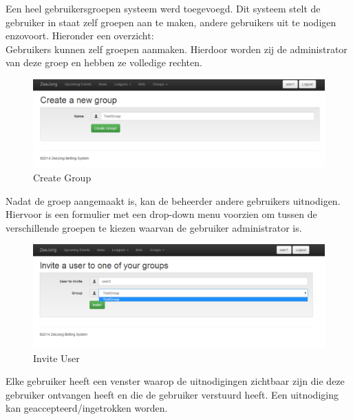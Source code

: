 \documentclass[11pt]{article}
\begin{document}
Een heel gebruikersgroepen systeem werd toegevoegd.  Dit systeem stelt de gebruiker in staat zelf groepen aan te maken, andere gebruikers uit te nodigen enzovoort.  Hieronder een overzicht:\\

Gebruikers kunnen zelf groepen aanmaken.  Hierdoor worden zij de administrator van deze groep en hebben ze volledige rechten.\\

\begin{figure}[h!]
	\begin{center}
	\includegraphics[scale=0.4]{createGroup.png}

	\caption{Create Group}
	\label{fig:createGroup}
	\end{center}
\end{figure}

Nadat de groep aangemaakt is, kan de beheerder andere gebruikers uitnodigen.  Hiervoor is een formulier met een drop-down menu voorzien om tussen de verschillende groepen te kiezen waarvan de gebruiker administrator is.\\

\begin{figure}[h!]
	\begin{center}
	\includegraphics[scale=0.4]{inviteUser.png}

	\caption{Invite User}
	\label{fig:inviteUser}
	\end{center}
\end{figure}

Elke gebruiker heeft een venster waarop de uitnodigingen zichtbaar zijn die deze gebruiker ontvangen heeft en die de gebruiker verstuurd heeft.  Een uitnodiging kan geaccepteerd/ingetrokken worden.\\
\end{document}

